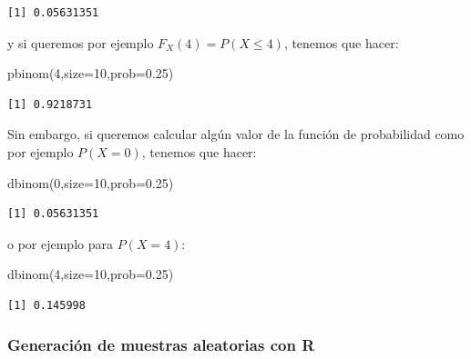 \documentclass[
  letterpaper,
  DIV=11,
  numbers=noendperiod]{scrreprt}
\newenvironment{Shaded}{\begin{snugshade}}{\end{snugshade}}
\newcommand{\AttributeTok}[1]{\textcolor[rgb]{0.40,0.45,0.13}{#1}}
\newcommand{\DecValTok}[1]{\textcolor[rgb]{0.68,0.00,0.00}{#1}}
\newcommand{\FloatTok}[1]{\textcolor[rgb]{0.68,0.00,0.00}{#1}}
\newcommand{\FunctionTok}[1]{\textcolor[rgb]{0.28,0.35,0.67}{#1}}
\newcommand{\NormalTok}[1]{\textcolor[rgb]{0.00,0.23,0.31}{#1}}
\begin{document}
\begin{verbatim}
[1] 0.05631351
\end{verbatim}

y si queremos por ejemplo \(F_X(4)=P(X\leq 4)\), tenemos que hacer:

\begin{Shaded}
\begin{Highlighting}[]
\FunctionTok{pbinom}\NormalTok{(}\DecValTok{4}\NormalTok{,}\AttributeTok{size=}\DecValTok{10}\NormalTok{,}\AttributeTok{prob=}\FloatTok{0.25}\NormalTok{)}
\end{Highlighting}
\end{Shaded}

\begin{verbatim}
[1] 0.9218731
\end{verbatim}

Sin embargo, si queremos calcular algún valor de la función de
probabilidad como por ejemplo \(P(X=0)\), tenemos que hacer:

\begin{Shaded}
\begin{Highlighting}[]
\FunctionTok{dbinom}\NormalTok{(}\DecValTok{0}\NormalTok{,}\AttributeTok{size=}\DecValTok{10}\NormalTok{,}\AttributeTok{prob=}\FloatTok{0.25}\NormalTok{)}
\end{Highlighting}
\end{Shaded}

\begin{verbatim}
[1] 0.05631351
\end{verbatim}

o por ejemplo para \(P(X=4)\):

\begin{Shaded}
\begin{Highlighting}[]
\FunctionTok{dbinom}\NormalTok{(}\DecValTok{4}\NormalTok{,}\AttributeTok{size=}\DecValTok{10}\NormalTok{,}\AttributeTok{prob=}\FloatTok{0.25}\NormalTok{)}
\end{Highlighting}
\end{Shaded}

\begin{verbatim}
[1] 0.145998
\end{verbatim}

\subsubsection{Generación de muestras aleatorias con
R}\label{generaciuxf3n-de-muestras-aleatorias-con-r}
\end{document}
